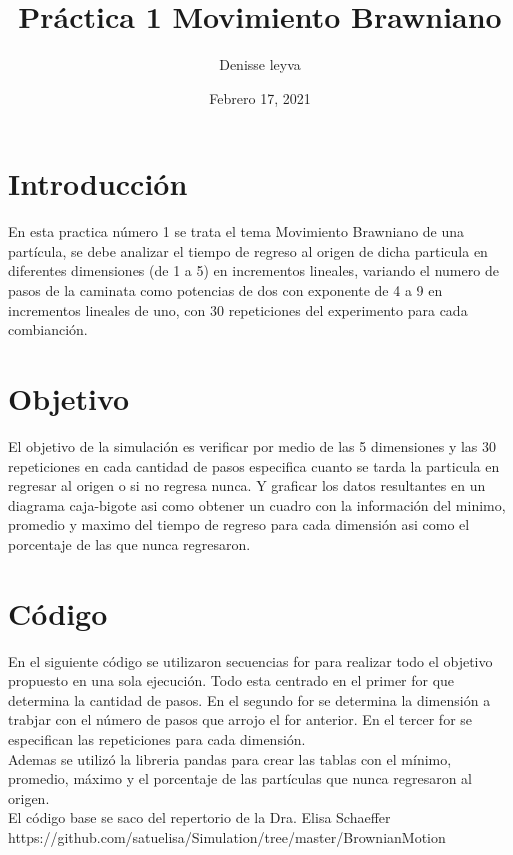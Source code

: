 \documentclass{article}
\title{Práctica 1 Movimiento Brawniano}
\author{Denisse leyva}
\date{Febrero 17, 2021}
\begin{document}
\maketitle

\section{Introducción}
En esta practica número 1 se trata el tema Movimiento Brawniano de una partícula, se debe analizar el tiempo de regreso al origen de dicha particula en diferentes dimensiones (de 1 a 5) en incrementos lineales, variando el numero de pasos de la caminata como potencias de dos con exponente de 4 a 9 en  incrementos lineales de uno, con 30 repeticiones del experimento para cada combianción.  


\section{Objetivo}
El objetivo de la simulación es verificar por medio de las 5 dimensiones y las 30 repeticiones en cada cantidad de pasos especifica cuanto se tarda la particula en regresar al origen o si no regresa nunca. 
Y graficar los datos resultantes en un diagrama caja-bigote asi como obtener un cuadro con la información del minimo, promedio y maximo del tiempo de regreso para cada dimensión asi como el porcentaje de las que nunca regresaron.


\section{Código}
En el siguiente código se utilizaron secuencias for para realizar todo el objetivo propuesto en una sola ejecución.
Todo esta centrado en el primer for que determina la cantidad de pasos. En el segundo for se determina la dimensión a trabjar con el número de pasos que arrojo el for anterior. En el tercer for se especifican las repeticiones para cada dimensión.\\
Ademas se utilizó la libreria pandas para crear las tablas con el mínimo, promedio, máximo y el porcentaje de las partículas que nunca regresaron al origen.\\
El código base se saco del repertorio de la Dra. Elisa Schaeffer\\ https://github.com/satuelisa/Simulation/tree/master/BrownianMotion\\
\end{document}
